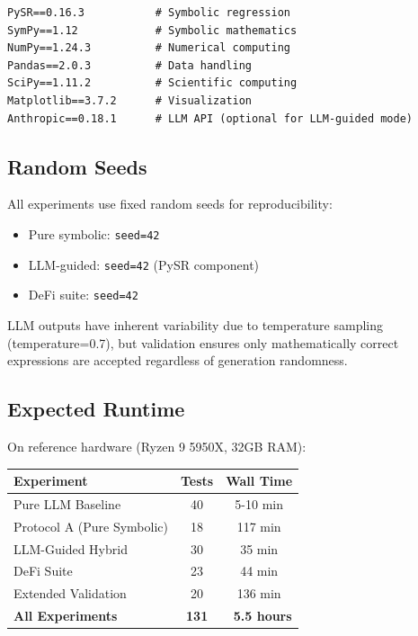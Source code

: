 \begin{small}
\begin{verbatim}
PySR==0.16.3           # Symbolic regression
SymPy==1.12            # Symbolic mathematics
NumPy==1.24.3          # Numerical computing
Pandas==2.0.3          # Data handling
SciPy==1.11.2          # Scientific computing
Matplotlib==3.7.2      # Visualization
Anthropic==0.18.1      # LLM API (optional for LLM-guided mode)
\end{verbatim}
\end{small}

\subsection{Random Seeds}

All experiments use fixed random seeds for reproducibility:

\begin{itemize}
\item Pure symbolic: \texttt{seed=42}
\item LLM-guided: \texttt{seed=42} (PySR component)
\item DeFi suite: \texttt{seed=42}
\end{itemize}

LLM outputs have inherent variability due to temperature sampling (temperature=0.7), but validation ensures only mathematically correct expressions are accepted regardless of generation randomness.

\subsection{Expected Runtime}

On reference hardware (Ryzen 9 5950X, 32GB RAM):

\begin{table}[H]
\centering
\begin{tabular}{@{}lcc@{}}
\toprule
\textbf{Experiment} & \textbf{Tests} & \textbf{Wall Time} \\
\midrule
Pure LLM Baseline & 40 & 5-10 min \\
Protocol A (Pure Symbolic) & 18 & 117 min \\
LLM-Guided Hybrid & 30 & 35 min \\
DeFi Suite & 23 & 44 min \\
Extended Validation & 20 & 136 min \\
\midrule
\textbf{All Experiments} & \textbf{131} & \textbf{~5.5 hours} \\
\bottomrule
\end{tabular}
\end{table}

